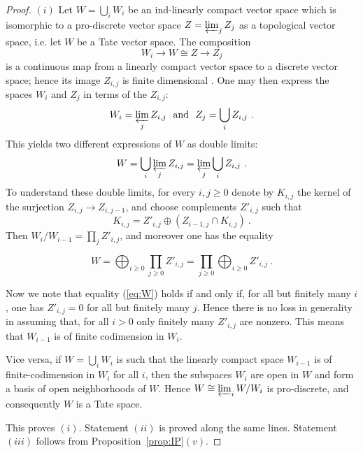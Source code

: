 \documentclass[12pt,reqno]{amsart}
\theoremstyle{definition}
\theoremstyle{remark}
\begin{document}
	\begin{proof}
    $(i)$ Let $W = \bigcup_i W_i$ be an ind-linearly compact vector space which is isomorphic to a pro-discrete vector space $Z = \varprojlim_j Z_j$ as a topological vector space, i.e. let $W$ be a Tate vector space. The composition 
    $$
    W_i \rightarrow W \cong Z \rightarrow Z_j
    $$
    is a continuous map from a linearly compact vector space to a discrete vector space; hence its image $Z_{i,j}$ is finite dimensional . One may then express the spaces $W_i$ and $Z_j$ in terms of the $Z_{i,j}$:
    $$
    W_i = \varprojlim_j Z_{i,j} \ \ \mathrm{and} \ \ Z_j = \bigcup_i Z_{i,j} \ .
    $$
    This yields two different expressions of $W$ as double limits:
    $$
    W = \bigcup_i \varprojlim_j Z_{i,j} = \varprojlim_j \bigcup_i Z_{i,j} \ .
    $$
    To understand these double limits, for every $i,j \geq 0$ denote by $K_{i,j}$ the kernel of the surjection $Z_{i,j}\rightarrow Z_{i, j-1}$, and choose complements $Z'_{i,j}$ such that
    $$
    K_{i,j} = Z'_{i,j} \oplus (Z_{i-1, j}\cap K_{i,j}) \ .
    $$
    Then $W_{i}/ W_{i-1} = \prod_j Z'_{i,j}$, and moreover one has the equality
    
    \begin{equation}\label{eq:W}
        W = \bigoplus_{i\geq 0} \prod_{j\geq 0} Z'_{i,j} = \prod_{j\geq 0} \bigoplus_{i\geq 0} Z'_{i,j} \ .
    \end{equation}
    
    Now we note that equality (\ref{eq:W}) holds if and only if, for all but finitely many $i$, one has $Z'_{i,j} = 0$ for all but finitely many $j$. Hence there is no loss in generality in assuming that, for all $i > 0$ only finitely many $Z'_{i,j}$ are nonzero. This means that $W_{i-1}$ is of finite codimension in $W_i$.

    Vice versa, if $W = \bigcup_i W_i$ is such that the linearly compact space $W_{i-1}$ is of finite-codimension in $W_i$ for all $i$, then the subspaces $W_i$ are open in $W$ and form a basis of open neighborhoods of $W$. Hence $W \cong \varprojlim_i W/W_i$ is pro-discrete, and consequently $W$ is a Tate space.

    This proves $(i)$. Statement $(ii)$ is proved along the same lines. Statement $(iii)$ follows from Proposition~\ref{prop:IP}$(v)$.


\end{proof}
\end{document}
